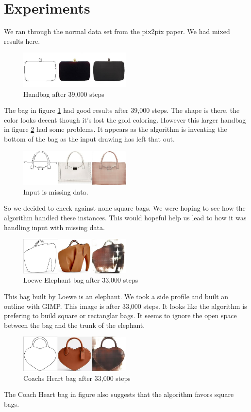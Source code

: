 \documentclass[conference]{IEEEtran}
\begin{document}
\section{Experiments}
We ran through the normal data set from the pix2pix \cite{imagetoimage} paper. We had mixed
results here.
\begin{figure}[h]
  \includegraphics[width=0.5\textwidth]{./image_dump_39000.jpg}
  \caption{\label{fig:handbag39} Handbag after 39,000 steps}
  \centering
\end{figure}
The bag in figure \ref{fig:handbag39} had good results after 39,000 steps. The shape is there, the color
looks decent though it's lost the gold coloring. However this larger handbag in figure
\ref{fig:missing-data} had some problems. It appears as the algorithm is inventing the bottom of the bag
as the input drawing has left that out.
\begin{figure}[h]
  \includegraphics[width=0.5\textwidth]{./bad_result.jpg}
  \caption{\label{fig:missing-data} Input is missing data.}
  \centering
\end{figure}
So we decided to check against none square bags. We were hoping to see how the algorithm handled these instances.
This would hopeful help us lead to how it was handling input with missing data.
\begin{figure}[h]
  \includegraphics[width=0.5\textwidth]{./bad_elephant_33000.jpg}
  \caption{\label{fig:loewe} Loewe Elephant bag after 33,000 steps}
  \centering
\end{figure}
This bag built by Loewe is an elephant. We took a side profile and built an outline with GIMP. This image is after
33,000 steps. It looks like the algorithm is prefering to build square or rectanglar bags. It seems to ignore the
open space between the bag and the trunk of the elephant. 
\begin{figure}[h]
  \includegraphics[width=0.5\textwidth]{./heart_33000.jpg}
  \caption{\label{fig:coach} Coachs Heart bag after 33,000 steps}
  \centering
\end{figure}
The Coach Heart bag in figure \label{fig:coach} also suggests that the algorithm favors square bags. 
\end{document}
